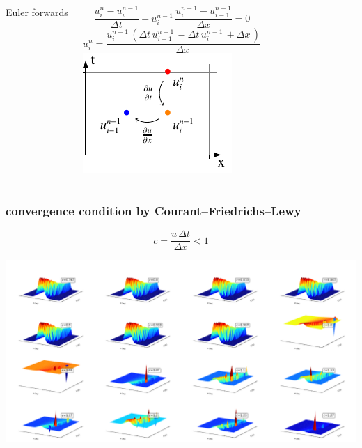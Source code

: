 \begin{frame}
  \begin{columns}
    Euler forwards

  $$\frac{u_{i}^{n}-u_{i}^{n-1}}{\Delta t}+ u_{i}^{n-1}\, \frac{u_{i}^{n-1}-u_{i-1}^{n-1}}{\Delta x}=0$$
  $$ u_{i}^{n} = \frac{u^{n-1}_{i}\, \left(\Delta{t}\, u^{n-1}_{i-1}\, - \Delta{t}\, u^{n-1}_{i}\, + \Delta{x}\,\right)}{\Delta{x}\,}$$
    \includegraphics[width=\linewidth]{../BurgersEquation/tikz/linear2/linear2.pdf}\\
  \end{columns}
\end{frame}

\begin{frame}
  \frametitle{convergence condition by Courant–Friedrichs–Lewy}
  \Huge{
  $$ c = \frac{u \, \Delta t}{\Delta x} < 1  $$
}
\end{frame}


\begin{frame}
  \includegraphics[width=\linewidth]{../BurgersEquation/images/multi_unstable.pdf}\\
\end{frame}


